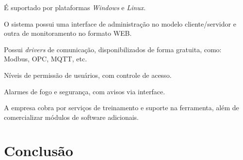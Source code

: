     \begin{alineascomponto}
        \item É suportado por plataformas \textit{Windows} e \textit{Linux}.
	    \item O sistema possui uma interface de administração no modelo cliente/servidor e outra de monitoramento no formato \gls{WEB}.
	    \item Possui \textit{drivers} de comunicação, disponibilizados de forma gratuita, como: Modbus, \gls{OPC}, \gls{MQTT}, etc.
	    \item Níveis de permissão de usuários, com controle de acesso.
	    \item Alarmes de fogo e segurança, com avisos via interface.
	    \item A empresa cobra por serviços de treinamento e suporte na ferramenta, além de comercializar módulos de software adicionais.
    \end{alineascomponto}
    
\section{Conclusão}
\label{sec:conclusao-scada}